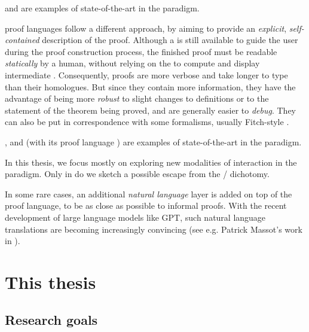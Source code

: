 \begin{description}[labelsep=0pt]
   and  are examples of state-of-the-art  in the
   paradigm.
  
  proof languages follow a different approach, by
  aiming to provide an \emph{explicit}, \emph{self-contained} description of the
  proof. Although a  is still available to guide the user during the
  proof construction process, the finished proof must be readable
  \emph{statically} by a human, without relying on the  to compute and
  display intermediate . Consequently,  proofs are more
  verbose and take longer to type than their  homologues. But since
  they contain more information, they have the advantage of being more
  \emph{robust} to slight changes to definitions or to the statement of the
  theorem being proved, and are generally easier to \emph{debug}. They can also
  be put in correspondence with some  formalisms, usually
  Fitch-style  \cite{geuvers_proof_2009}.
  
  ,  and  (with its  proof
  language ) are examples of state-of-the-art  in the  paradigm.
\end{description}

\begin{emphpar}
  In this thesis, we focus mostly on exploring new modalities of interaction in
  the \emph{} paradigm. Only in  do we
  sketch a possible escape from the / dichotomy.
\end{emphpar}

\begin{remark}
In some rare cases, an additional \emph{natural language} layer is added on top
of the proof language, to be as close as possible to informal proofs. With the
recent development of large language models like GPT, such natural language
translations are becoming increasingly convincing (see e.g. Patrick Massot's
work in  \cite{LeanIPAM}).
\end{remark}


\section{This thesis}

\subsection{Research goals}

